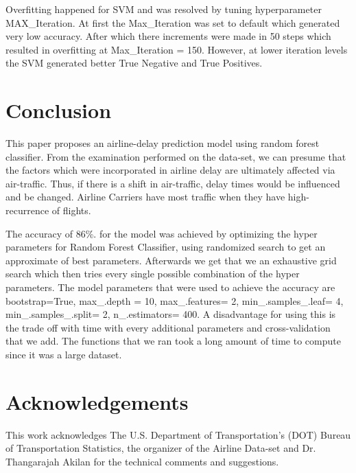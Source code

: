 \documentclass[conference]{IEEEtran}
\begin{document}
Overfitting happened for SVM and was resolved by tuning hyperparameter MAX\_Iteration. At first the Max\_Iteration was set to default which generated very low accuracy. After which there increments were made in 50 steps which resulted in overfitting at Max\_Iteration = 150. However, at lower iteration levels the SVM generated better True Negative and True Positives.

\section{Conclusion}\label{Section V}
 

This paper proposes an airline-delay prediction model using random forest classifier. From the examination performed on the data-set, we can presume that the factors which were incorporated in airline delay are ultimately affected via air-traffic. Thus, if there is a shift in air-traffic, delay times  would be influenced and be changed. Airline Carriers have most traffic when they have high-recurrence of flights.

The accuracy of 86\%. for the model was achieved by optimizing the hyper parameters for Random Forest Classifier, using randomized search to get an approximate of best parameters. Afterwards we get that we an exhaustive grid search which then tries every single possible combination of the hyper parameters. The model parameters that were used to achieve the accuracy are bootstrap=True, max\_.depth = 10, max\_.features= 2, min\_.samples\_.leaf= 4, min\_.samples\_.split= 2, n\_.estimators= 400. A disadvantage for using this is the trade off with time with every additional parameters and cross-validation that we add. The functions that we ran took a long amount of time to compute since it was a large dataset.    
 

\section*{Acknowledgements}\label{Acknowledgements}
\begin{center}
This work acknowledges The U.S. Department of Transportation's (DOT) Bureau of Transportation Statistics, the organizer of the Airline Data-set and Dr. Thangarajah Akilan for the technical comments and suggestions.
\end{center}
\end{document}
